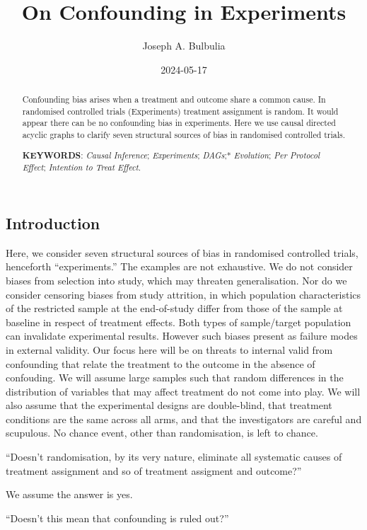 \documentclass[
  single column]{article}
\title{On Confounding in Experiments}
\author{Joseph A. Bulbulia}
\affil{%
             \small{     Victoria University of Wellington, New Zealand
          ORCID \textcolor[HTML]{A6CE39}{\aiOrcid} ~0000-0002-5861-2056 }
              }
\date{2024-05-17}
\begin{document}
\maketitle
\begin{abstract}
Confounding bias arises when a treatment and outcome share a common
cause. In randomised controlled trials (Experiments) treatment
assignment is random. It would appear there can be no confounding bias
in experiments. Here we use causal directed acyclic graphs to clarify
seven structural sources of bias in randomised controlled trials.

\textbf{KEYWORDS}: \emph{Causal Inference}; \emph{Experiments};
\emph{DAGs};* \emph{Evolution}; \emph{Per Protocol Effect};
\emph{Intention to Treat Effect}.
\end{abstract}

\subsection{Introduction}\label{introduction}

Here, we consider seven structural sources of bias in randomised
controlled trials, henceforth ``experiments.'' The examples are not
exhaustive. We do not consider biases from selection into study, which
may threaten generalisation. Nor do we consider censoring biases from
study attrition, in which population characteristics of the restricted
sample at the end-of-study differ from those of the sample at baseline
in respect of treatment effects. Both types of sample/target population
can invalidate experimental results. However such biases present as
failure modes in external validity. Our focus here will be on threats to
internal valid from confounding that relate the treatment to the outcome
in the absence of confouding. We will assume large samples such that
random differences in the distribution of variables that may affect
treatment do not come into play. We will also assume that the
experimental designs are double-blind, that treatment conditions are the
same across all arms, and that the investigators are careful and
scupulous. No chance event, other than randomisation, is left to chance.

``Doesn't randomisation, by its very nature, eliminate all systematic
causes of treatment assignment and so of treatment assigment and
outcome?''

We assume the answer is yes.

``Doesn't this mean that confounding is ruled out?''
\end{document}
